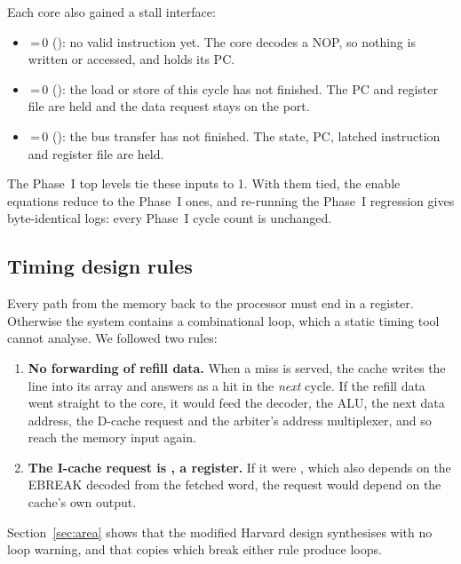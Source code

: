 Each core also gained a stall interface:
\begin{itemize}
  \item {}\,=\,0 (): no valid instruction yet. The core decodes a
        NOP, so nothing is written or accessed, and holds its PC.
  \item {}\,=\,0 (): the load or store of this cycle has not
        finished. The PC and register file are held and the data request stays on the port.
  \item {}\,=\,0 (): the bus transfer has not finished. The
        state, PC, latched instruction and register file are held.
\end{itemize}
The Phase~I top levels tie these inputs to 1. With them tied, the enable equations reduce to the
Phase~I ones, and re-running the Phase~I regression gives byte-identical logs: every Phase~I
cycle count is unchanged.

\subsection{Timing design rules}
Every path from the memory back to the processor must end in a register. Otherwise the system
contains a combinational loop, which a static timing tool cannot analyse. We followed two rules:
\begin{enumerate}
  \item \textbf{No forwarding of refill data.} When a miss is served, the cache writes the line
        into its array and answers as a hit in the \emph{next} cycle. If the refill data went
        straight to the core, it would feed the decoder, the ALU, the next data address, the
        D-cache request and the arbiter's address multiplexer, and so reach the memory input
        again.
  \item \textbf{The I-cache request is , a register.} If it were
        , which also depends on the EBREAK decoded from the fetched
        word, the request would depend on the cache's own output.
\end{enumerate}
Section~\ref{sec:area} shows that the modified Harvard design synthesises with no loop warning,
and that copies which break either rule produce loops.
